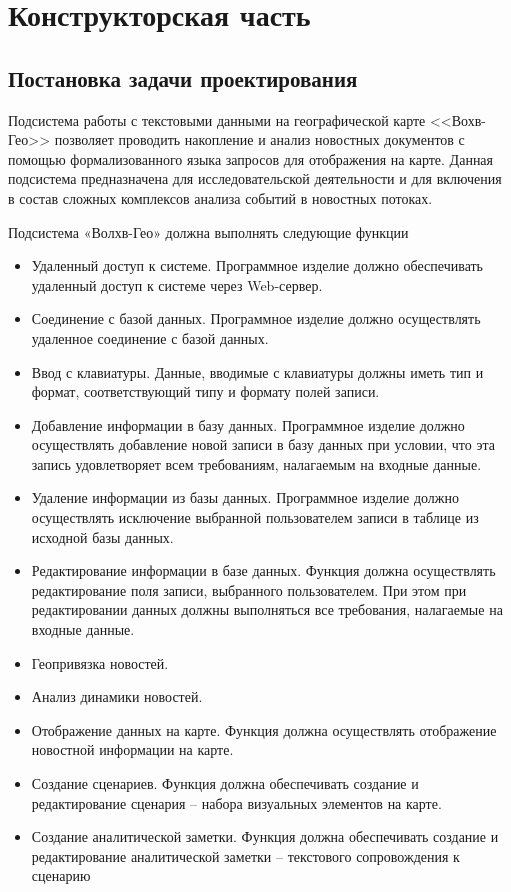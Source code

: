 \section{Конструкторская часть}

\subsection{Постановка задачи проектирования}

Подсистема работы с текстовыми данными на географической карте <<Вохв-Гео>> позволяет проводить накопление и анализ новостных документов с помощью формализованного языка запросов для отображения на карте. Данная подсистема предназначена для исследовательской деятельности и для включения в состав сложных комплексов анализа событий в новостных потоках.

Подсистема «Волхв-Гео» должна выполнять следующие функции
\begin{itemize}
\item Удаленный доступ к системе. Программное изделие должно обеспечивать удаленный доступ к системе через Web-сервер.
\item Соединение с базой данных. Программное изделие должно осуществлять удаленное соединение с базой данных.
\item Ввод с клавиатуры. Данные, вводимые с клавиатуры должны иметь тип и формат, соответствующий типу и формату полей записи.
\item Добавление информации в базу данных. Программное изделие должно осуществлять добавление новой записи в базу данных при условии, что эта запись удовлетворяет всем требованиям, налагаемым на входные данные.
\item Удаление информации из базы данных. Программное изделие должно осуществлять исключение выбранной пользователем записи в таблице из исходной базы данных.
\item Редактирование информации в базе данных. Функция должна осуществлять редактирование поля записи, выбранного пользователем. При этом при редактировании данных должны выполняться все требования, налагаемые на входные данные.
\item Геопривязка новостей.
\item Анализ динамики новостей.
\item Отображение данных на карте. Функция должна осуществлять отображение новостной информации на карте.
\item Создание сценариев. Функция должна обеспечивать создание и редактирование сценария – набора визуальных элементов на карте.
\item Создание аналитической заметки. Функция должна обеспечивать создание и редактирование аналитической заметки – текстового сопровождения к сценарию
\end{itemize}


